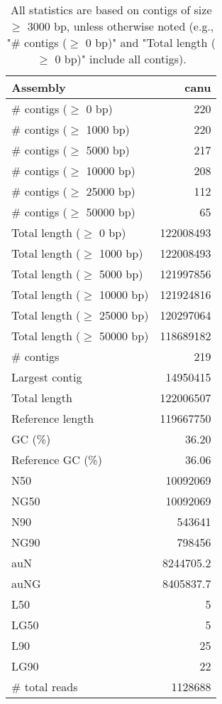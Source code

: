 \documentclass[12pt,a4paper]{article}
\begin{document}
\begin{table}[ht]
\begin{center}
\caption{All statistics are based on contigs of size $\geq$ 3000 bp, unless otherwise noted (e.g., "\# contigs ($\geq$ 0 bp)" and "Total length ($\geq$ 0 bp)" include all contigs).}
\begin{tabular}{|l*{1}{|r}|}
\hline
Assembly & canu \\ \hline
\# contigs ($\geq$ 0 bp) & 220 \\ \hline
\# contigs ($\geq$ 1000 bp) & 220 \\ \hline
\# contigs ($\geq$ 5000 bp) & 217 \\ \hline
\# contigs ($\geq$ 10000 bp) & 208 \\ \hline
\# contigs ($\geq$ 25000 bp) & 112 \\ \hline
\# contigs ($\geq$ 50000 bp) & 65 \\ \hline
Total length ($\geq$ 0 bp) & 122008493 \\ \hline
Total length ($\geq$ 1000 bp) & 122008493 \\ \hline
Total length ($\geq$ 5000 bp) & 121997856 \\ \hline
Total length ($\geq$ 10000 bp) & 121924816 \\ \hline
Total length ($\geq$ 25000 bp) & 120297064 \\ \hline
Total length ($\geq$ 50000 bp) & 118689182 \\ \hline
\# contigs & 219 \\ \hline
Largest contig & 14950415 \\ \hline
Total length & 122006507 \\ \hline
Reference length & 119667750 \\ \hline
GC (\%) & 36.20 \\ \hline
Reference GC (\%) & 36.06 \\ \hline
N50 & 10092069 \\ \hline
NG50 & 10092069 \\ \hline
N90 & 543641 \\ \hline
NG90 & 798456 \\ \hline
auN & 8244705.2 \\ \hline
auNG & 8405837.7 \\ \hline
L50 & 5 \\ \hline
LG50 & 5 \\ \hline
L90 & 25 \\ \hline
LG90 & 22 \\ \hline
\# total reads & 1128688 \\ \hline

\end{tabular}
\end{center}
\end{table}
\end{document}
